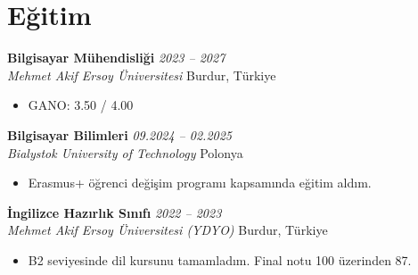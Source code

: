 \section{Eğitim}

\textbf{Bilgisayar Mühendisliği} \hfill \textit{2023 -- 2027} \\
\textit{Mehmet Akif Ersoy Üniversitesi} \hfill Burdur, Türkiye
\begin{itemize}[leftmargin=1.5em, itemsep=0pt, topsep=2pt]
  \item GANO: 3.50 / 4.00
\end{itemize}

\vspace{0.4em}

\textbf{Bilgisayar Bilimleri} \hfill \textit{09.2024 -- 02.2025} \\
\textit{Bialystok University of Technology} \hfill Polonya
\begin{itemize}[leftmargin=1.5em, itemsep=0pt, topsep=2pt]
  \item Erasmus+ öğrenci değişim programı kapsamında eğitim aldım.
\end{itemize}

\vspace{0.4em}

\textbf{İngilizce Hazırlık Sınıfı} \hfill \textit{2022 -- 2023} \\
\textit{Mehmet Akif Ersoy Üniversitesi (YDYO)} \hfill Burdur, Türkiye
\begin{itemize}[leftmargin=1.5em, itemsep=0pt, topsep=2pt]
  \item B2 seviyesinde dil kursunu tamamladım. Final notu 100 üzerinden 87.
\end{itemize}
